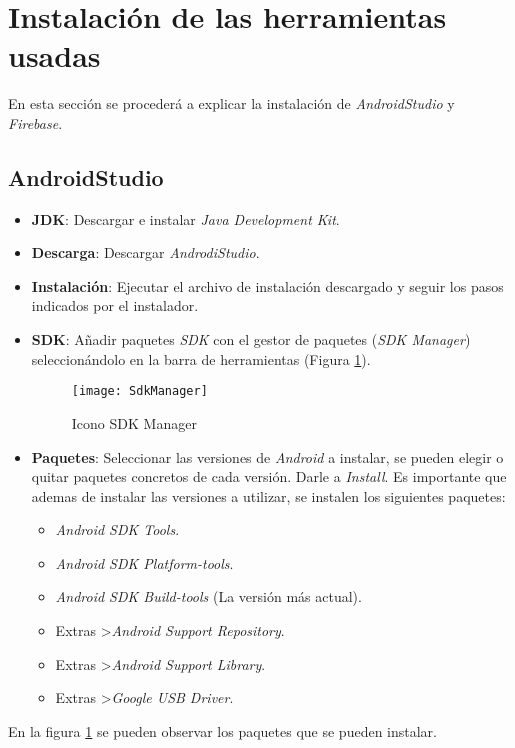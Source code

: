 	\section{Instalación de las herramientas usadas}
	En esta sección se procederá a explicar la instalación de {\it AndroidStudio} y {\it Firebase}.
	
	\subsection{AndroidStudio}
	\begin{itemize}
		\item {\bf JDK}: Descargar e instalar {\it Java Development Kit}\cite{17:jdk:online}.
		\item {\bf Descarga}: Descargar {\it AndrodiStudio}.
		\item {\bf Instalación}: Ejecutar el archivo de instalación descargado y seguir los pasos indicados por el instalador.
		\item {\bf SDK}: Añadir paquetes {\it SDK} con el gestor de paquetes ({\it SDK Manager}) seleccionándolo en la barra de herramientas (Figura \ref{fig:SdkManager}).

		\begin{figure}[h !]
			\centering
			\texttt{[image: SdkManager]}
			\caption{Icono SDK Manager}
			\label{fig:SdkManager}
		\end{figure}
		\item {\bf Paquetes}: Seleccionar las versiones de {\it Android} \cite{2:android:online} a instalar, se pueden elegir o quitar paquetes concretos de cada versión. Darle a {\it Install}. Es importante que ademas de instalar las versiones a utilizar, se instalen los siguientes paquetes:
		\begin{itemize}
			\item {\it Android SDK Tools}.
			\item {\it Android SDK Platform-tools}.
			\item {\it Android SDK Build-tools} (La versión más actual).
			\item Extras \textgreater {\it Android Support Repository}.
			\item Extras \textgreater {\it Android Support Library}.
			\item Extras \textgreater {\it Google USB Driver}.
		\end{itemize}
	\end{itemize}
	
	En la figura \ref{fig:SdkManager} se pueden observar los paquetes que se pueden instalar.
	
